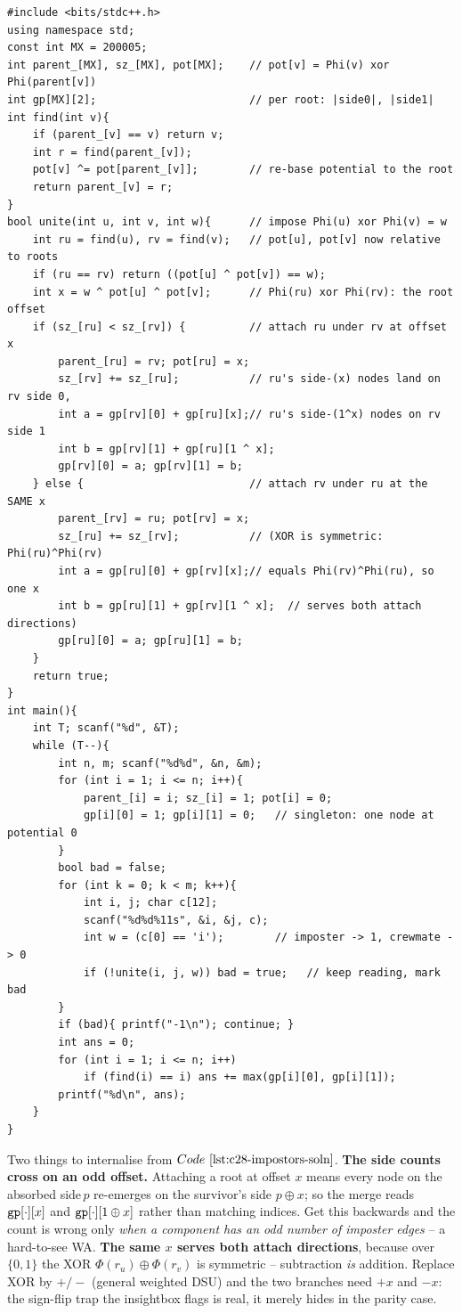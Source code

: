 \begin{lstlisting}[caption={CF 1594D full solution (parity weighted DSU)}, label={lst:c28-impostors-soln}]
#include <bits/stdc++.h>
using namespace std;
const int MX = 200005;
int parent_[MX], sz_[MX], pot[MX];    // pot[v] = Phi(v) xor Phi(parent[v])
int gp[MX][2];                        // per root: |side0|, |side1|
int find(int v){
    if (parent_[v] == v) return v;
    int r = find(parent_[v]);
    pot[v] ^= pot[parent_[v]];        // re-base potential to the root
    return parent_[v] = r;
}
bool unite(int u, int v, int w){      // impose Phi(u) xor Phi(v) = w
    int ru = find(u), rv = find(v);   // pot[u], pot[v] now relative to roots
    if (ru == rv) return ((pot[u] ^ pot[v]) == w);
    int x = w ^ pot[u] ^ pot[v];      // Phi(ru) xor Phi(rv): the root offset
    if (sz_[ru] < sz_[rv]) {          // attach ru under rv at offset x
        parent_[ru] = rv; pot[ru] = x;
        sz_[rv] += sz_[ru];           // ru's side-(x) nodes land on rv side 0,
        int a = gp[rv][0] + gp[ru][x];// ru's side-(1^x) nodes on rv side 1
        int b = gp[rv][1] + gp[ru][1 ^ x];
        gp[rv][0] = a; gp[rv][1] = b;
    } else {                          // attach rv under ru at the SAME x
        parent_[rv] = ru; pot[rv] = x;
        sz_[ru] += sz_[rv];           // (XOR is symmetric: Phi(ru)^Phi(rv)
        int a = gp[ru][0] + gp[rv][x];// equals Phi(rv)^Phi(ru), so one x
        int b = gp[ru][1] + gp[rv][1 ^ x];  // serves both attach directions)
        gp[ru][0] = a; gp[ru][1] = b;
    }
    return true;
}
int main(){
    int T; scanf("%d", &T);
    while (T--){
        int n, m; scanf("%d%d", &n, &m);
        for (int i = 1; i <= n; i++){
            parent_[i] = i; sz_[i] = 1; pot[i] = 0;
            gp[i][0] = 1; gp[i][1] = 0;   // singleton: one node at potential 0
        }
        bool bad = false;
        for (int k = 0; k < m; k++){
            int i, j; char c[12];
            scanf("%d%d%11s", &i, &j, c);
            int w = (c[0] == 'i');        // imposter -> 1, crewmate -> 0
            if (!unite(i, j, w)) bad = true;   // keep reading, mark bad
        }
        if (bad){ printf("-1\n"); continue; }
        int ans = 0;
        for (int i = 1; i <= n; i++)
            if (find(i) == i) ans += max(gp[i][0], gp[i][1]);
        printf("%d\n", ans);
    }
}
\end{lstlisting}

Two things to internalise from \(\coderef{c28-impostors-soln}\).
\textbf{The side counts cross on an odd offset.} Attaching a root at offset
\(x\) means every node on the absorbed side\(\,p\) re-emerges on the
survivor's side \(p\oplus x\); so the merge reads \(\texttt{gp}[\cdot][x]\)
and \(\texttt{gp}[\cdot][1\oplus x]\) rather than matching indices.  Get this
backwards and the count is wrong only \emph{when a component has an odd
number of imposter edges} -- a hard-to-see WA.  \textbf{The same \(x\) serves
both attach directions}, because over \(\{0,1\}\) the XOR
\(\Phi(r_u)\oplus\Phi(r_v)\) is symmetric -- subtraction \emph{is}
addition.  Replace XOR by \(+/-\) (general weighted DSU) and the two branches
need \(+x\) and \(-x\): the sign-flip trap the insightbox flags is real, it
merely hides in the parity case.

